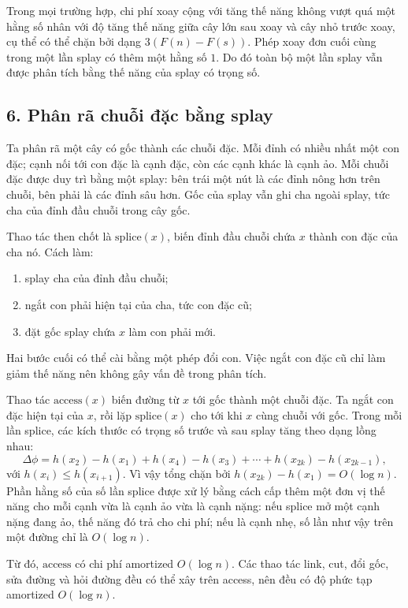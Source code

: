 \documentclass[11pt]{article}
\begin{document}
Trong mọi trường hợp, chi phí xoay cộng với tăng thế năng không vượt quá một
hằng số nhân với độ tăng thế năng giữa cây lớn sau xoay và cây nhỏ trước xoay,
cụ thể có thể chặn bởi dạng \(3(F(n)-F(s))\). Phép xoay đơn cuối cùng trong
một lần splay có thêm một hằng số \(1\). Do đó toàn bộ một lần splay vẫn được
phân tích bằng thế năng của splay có trọng số.

\subsection*{6. Phân rã chuỗi đặc bằng splay}

Ta phân rã một cây có gốc thành các chuỗi đặc. Mỗi đỉnh có nhiều nhất một con
đặc; cạnh nối tới con đặc là cạnh đặc, còn các cạnh khác là cạnh ảo. Mỗi chuỗi
đặc được duy trì bằng một splay: bên trái một nút là các đỉnh nông hơn trên
chuỗi, bên phải là các đỉnh sâu hơn. Gốc của splay vẫn ghi cha ngoài splay,
tức cha của đỉnh đầu chuỗi trong cây gốc.

Thao tác then chốt là \(\mathrm{splice}(x)\), biến đỉnh đầu chuỗi chứa \(x\)
thành con đặc của cha nó. Cách làm:
\begin{enumerate}
  \item splay cha của đỉnh đầu chuỗi;
  \item ngắt con phải hiện tại của cha, tức con đặc cũ;
  \item đặt gốc splay chứa \(x\) làm con phải mới.
\end{enumerate}
Hai bước cuối có thể cài bằng một phép đổi con. Việc ngắt con đặc cũ chỉ làm
giảm thế năng nên không gây vấn đề trong phân tích.

Thao tác \(\mathrm{access}(x)\) biến đường từ \(x\) tới gốc thành một chuỗi
đặc. Ta ngắt con đặc hiện tại của \(x\), rồi lặp \(\mathrm{splice}(x)\) cho tới
khi \(x\) cùng chuỗi với gốc. Trong mỗi lần splice, các kích thước có trọng số
trước và sau splay tăng theo dạng lồng nhau:
\[
  \Delta\phi=h(x_2)-h(x_1)+h(x_4)-h(x_3)+\cdots+h(x_{2k})-h(x_{2k-1}),
\]
với \(h(x_i)\le h(x_{i+1})\). Vì vậy tổng chặn bởi
\(h(x_{2k})-h(x_1)=O(\log n)\). Phần hằng số của số lần splice được xử lý bằng
cách cấp thêm một đơn vị thế năng cho mỗi cạnh vừa là cạnh ảo vừa là cạnh nặng:
nếu splice mở một cạnh nặng đang ảo, thế năng đó trả cho chi phí; nếu là cạnh
nhẹ, số lần như vậy trên một đường chỉ là \(O(\log n)\).

Từ đó, \(\mathrm{access}\) có chi phí amortized \(O(\log n)\). Các thao tác
link, cut, đổi gốc, sửa đường và hỏi đường đều có thể xây trên access, nên đều
có độ phức tạp amortized \(O(\log n)\).
\end{document}
